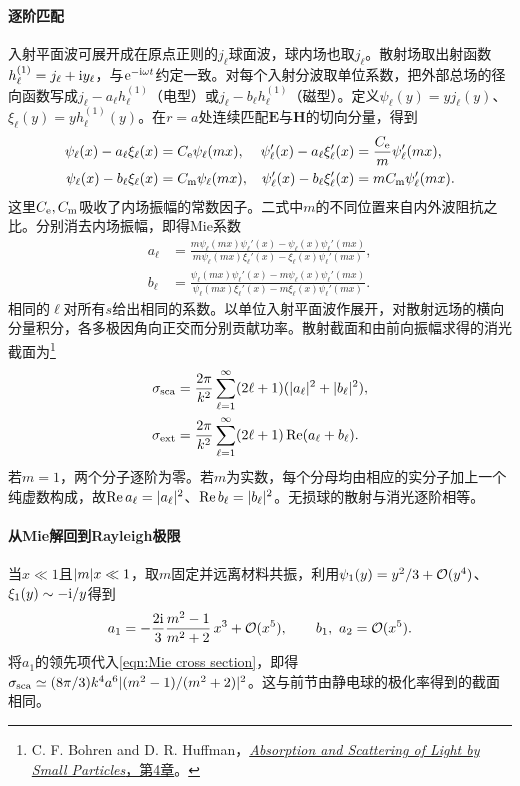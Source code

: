 \paragraph{逐阶匹配}
入射平面波可展开成在原点正则的$j_\ell$球面波，球内场也取$j_\ell$。散射场取出射函数$h_\ell^{(1)} = j_\ell + \mathrm{i} y_\ell$，与$\mathop{}\!\mathrm{e}^{-\mathrm{i}\omega t}$约定一致。对每个入射分波取单位系数，把外部总场的径向函数写成$j_\ell - a_\ell h_\ell^{(1)}$（电型）或$j_\ell - b_\ell h_\ell^{(1)}$（磁型）。定义$\psi_\ell(y) = y j_\ell(y)$、$\xi_\ell(y) = y h_\ell^{(1)}(y)$。在$r = a$处连续匹配$\bm E$与$\bm H$的切向分量，得到
\[
 \begin{aligned}
   \psi_\ell(x) - a_\ell\xi_\ell(x) &= C_\mathrm e\psi_\ell(mx),&
   \psi_\ell'(x) - a_\ell\xi_\ell'(x) &= \frac{C_\mathrm e}{m}\psi_\ell'(mx),\\
   \psi_\ell(x) - b_\ell\xi_\ell(x) &= C_\mathrm m\psi_\ell(mx),&
   \psi_\ell'(x) - b_\ell\xi_\ell'(x) &= m C_\mathrm m\psi_\ell'(mx).
 \end{aligned}
\]
这里$C_\mathrm e,C_\mathrm m$吸收了内场振幅的常数因子。二式中$m$的不同位置来自内外波阻抗之比。分别消去内场振幅，即得Mie系数
\begin{align}
    a_\ell &= \frac{m\psi_\ell(mx)\psi_\ell'(x) - \psi_\ell(x)\psi_\ell'(mx)}
                   {m\psi_\ell(mx)\xi_\ell'(x) - \xi_\ell(x)\psi_\ell'(mx)},\\
    b_\ell &= \frac{\psi_\ell(mx)\psi_\ell'(x) - m\psi_\ell(x)\psi_\ell'(mx)}
                   {\psi_\ell(mx)\xi_\ell'(x) - m\xi_\ell(x)\psi_\ell'(mx)} .
\end{align}
相同的$\ell$对所有$s$给出相同的系数。以单位入射平面波作展开，对散射远场的横向分量积分，各多极因角向正交而分别贡献功率。散射截面和由前向振幅求得的消光截面为\footnote{C. F. Bohren and D. R. Huffman，\href{https://doi.org/10.1002/9783527618156.ch4}{\textit{Absorption and Scattering of Light by Small Particles}，第4章}。}
\begin{align}
    \sigma_\mathrm{sca} &= \frac{2\pi}{k^2}\sum_{\ell=1}^\infty(2\ell + 1)
        (\lvert a_\ell\rvert^2 + \lvert b_\ell\rvert^2),\label{eqn:Mie cross section}\\
    \sigma_\mathrm{ext} &= \frac{2\pi}{k^2}\sum_{\ell=1}^\infty(2\ell + 1)
        \operatorname{Re}(a_\ell + b_\ell).
\end{align}
若$m = 1$，两个分子逐阶为零。若$m$为实数，每个分母均由相应的实分子加上一个纯虚数构成，故$\operatorname{Re} a_\ell = \lvert a_\ell\rvert^2$、$\operatorname{Re} b_\ell = \lvert b_\ell\rvert^2$。无损球的散射与消光逐阶相等。

\paragraph{从Mie解回到Rayleigh极限}
当$x \ll 1$且$\lvert m\rvert x \ll 1$，取$m$固定并远离材料共振，利用$\psi_1(y) = y^2/3 + \mathcal{O}(y^4)$、$\xi_1(y) \sim -\mathrm{i}/y$得到
\[
    a_1 = -\frac{2\mathrm{i}}{3}\frac{m^2 - 1}{m^2 + 2}\,x^3 + \mathcal{O}(x^5),
    \qquad b_1,\ a_2 = \mathcal{O}(x^5).
\]
将$a_1$的领先项代入\eqref{eqn:Mie cross section}，即得$\sigma_\mathrm{sca} \simeq (8\pi/3)k^4a^6\lvert(m^2 - 1)/(m^2 + 2)\rvert^2$。这与前节由静电球的极化率得到的截面相同。

